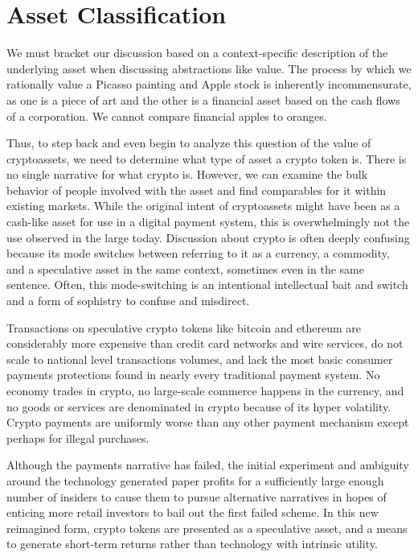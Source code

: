 \section{Asset Classification}

We must bracket our discussion based on a context-specific description of the
underlying asset when discussing abstractions like value. The process by which
we rationally value a Picasso painting and Apple stock is inherently
incommensurate, as one is a piece of art and the other is a financial asset
based on the cash flows of a corporation. We cannot compare financial apples to
oranges.

Thus, to step back and even begin to analyze this question of the value of
cryptoassets, we need to determine what type of asset a crypto token is. There
is no single narrative for what crypto is. However, we can examine the bulk
behavior of people involved with the asset and find comparables for it within
existing markets. While the original intent of cryptoassets might have been as a
cash-like asset for use in a digital payment system, this is overwhelmingly not
the use observed in the large today. Discussion about crypto is often deeply
confusing because its mode switches between referring to it as a currency, a
commodity, and a speculative asset in the same context, sometimes even in the
same sentence. Often, this mode-switching is an intentional intellectual bait
and switch and a form of sophistry to confuse and misdirect.

Transactions on speculative crypto tokens like bitcoin and ethereum are
considerably more expensive than credit card networks and wire services, do not
scale to national level transactions volumes, and lack the most basic consumer
payments protections found in nearly every traditional payment system. No
economy trades in crypto, no large-scale commerce happens in the currency, and
no goods or services are denominated in crypto because of its hyper volatility.
Crypto payments are uniformly worse than any other payment mechanism except
perhaps for illegal purchases.

Although the payments narrative has failed, the initial experiment and ambiguity
around the technology generated paper profits for a sufficiently large enough
number of insiders to cause them to pursue alternative narratives in hopes of
enticing more retail investors to bail out the first failed scheme. In this new
reimagined form, crypto tokens are presented as a speculative asset, and a means
to generate short-term returns rather than technology with intrinsic utility.

